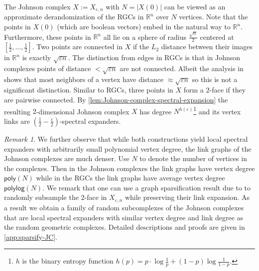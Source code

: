\documentclass[10pt,a4paper]{article}
\newcommand{\prettyref}[1]{\cref{#1}}
\theoremstyle{definition}
\theoremstyle{remark}
\newtheorem{remark}[theorem]{Remark}
\newcommand{\card}[1]{\lvert#1\rvert}
\DeclareMathOperator{\polylog}{polylog}
\newcommand{\R}{\mathbb R}
\renewcommand{\ge}{\geqslant}
\numberwithin{equation}{section}
\let\pref=\prettyref
\begin{document}
The Johnson complex $X:=X_{\varepsilon,n}$ with $N = \card{X(0)}$ can be viewed as an approximate derandomization of the RGCs in $\R^{n}$ over $N$ vertices. Note that the points in \(X(0)\) (which are boolean vectors) embed in the natural way to \(\R^{n}\). Furthermore, these points in $\R^{n}$ all lie on a sphere of radius $\frac{\sqrt{n}}{2}$ centered at $[\frac{1}{2}, \dots,\frac{1}{2}]$. Two points are connected in $X$ if the $L_2$ distance between their images in $\R^{n}$ is exactly $\sqrt{\varepsilon n}$. The distinction from edges in RGCs is that in Johnson complexes points of distance $<\sqrt{\varepsilon n}$ are not connected. Albeit the analysis in \cite{LiuMSY2023} shows that most neighbors of a vertex have distance \(\approx \sqrt{\varepsilon n}\) so this is not a significant distinction. Similar to RGCs, three points in $X$ form a $2$-face if they are pairwise connected. By \pref{lem:Johnson-complex-spectral-expansion} the resulting $2$-dimensional Johnson complex $X$ has degree $N^{h(\varepsilon)}$\footnote{$h$ is the binary entropy function $h(p) = p\cdot\log\frac{1}{p} + (1-p)\log\frac{1}{1-p}$. } and its vertex links are $\left(\frac{1}{2} - \frac{\varepsilon}{2}\right)$-spectral expanders. 

%
\begin{remark}
    We further observe that while both constructions yield local spectral expanders with arbitrarily small polynomial vertex degree, the link graphs of the Johnson complexes are much denser. Use $N$ to denote the number of vertices in the complexes. Then in the Johnson complexes the link graphs have vertex degree $\mathsf{poly}(N)$ while in the RGCs the link graphs have average vertex degree $\mathsf{polylog}(N)$.
    We remark that one can use a graph sparsification result due to \cite{ChungH07} to randomly subsample the $2$-face in $X_{\varepsilon,n}$ while preserving their link expansion. As a result we obtain a family of random subcomplexes of the Johnson complexes that are local spectral expanders with similar vertex degree and link degree as the random geometric complexes. Detailed descriptions and proofs are given in \pref{app:sparsify-JC}.
\end{remark}

\end{document}
